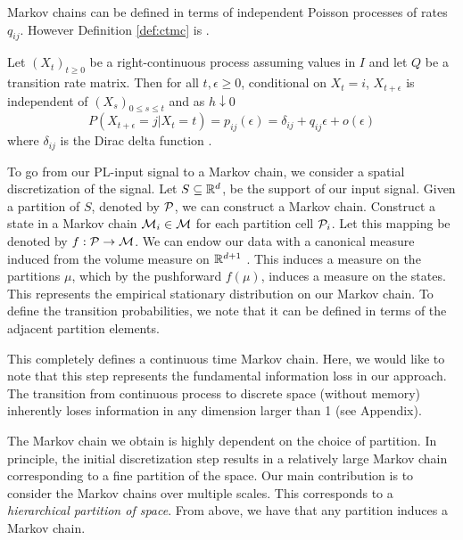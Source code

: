 Markov chains can be defined in terms of  independent Poisson processes
of rates $q_{ij}$. However Definition \ref{def:ctmc} is .

\begin{defn}
	\label{def:ctmc}
	Let $(X_t)_{t \ge 0}$ be a right-continuous process assuming values in $I$ and let $Q$
	be a transition rate matrix. Then for all $t, \epsilon \ge 0$, conditional on $X_t = i$,
	$X_{t+\epsilon}$ is independent of $(X_s)_{0 \le s \le t}$ and as $h \downarrow 0$
	\begin{equation}
		\nonumber
		P(X_{t+\epsilon} = j | X_t = t) = p_{ij}(\epsilon) = \delta_{ij} + q_{ij}\epsilon + o(\epsilon)
	\end{equation}
	where $\delta_{ij}$ is the Dirac delta function \cite{norris1998markov}.
\end{defn}



To go from our PL-input signal to a Markov chain, we consider a spatial discretization of the signal.
Let $S\subseteq \mathbb{R}^d$, be the support of our input signal. Given a partition of $S$, denoted by  $\mathcal{P}$, 
we can construct a Markov chain. Construct a  state in a Markov chain $\mathcal{M}_i \in \mathcal{M}$ for each  partition cell $\mathcal{P}_i$. Let this mapping be denoted by $f:\mathcal{P} \rightarrow \mathcal{M}$. We can endow our data with a canonical measure induced from the volume measure on $\mathbb{R}^{d+1}$ . This induces a measure on the partitions $\mu$, which by the  pushforward $f(\mu)$, induces a measure on the states. This represents the empirical stationary distribution on our Markov chain. To define the transition probabilities, we note that it can be defined in terms of the adjacent partition elements.  

This completely defines a continuous time Markov chain. Here, we would like to note that this step represents the fundamental information loss in our approach. The transition from continuous process to discrete space (without memory) inherently loses information in any dimension larger than 1 (see Appendix).  

The Markov chain we obtain is highly dependent on the choice of partition. In principle, the initial discretization step  results in a relatively large Markov chain corresponding to a fine partition of the space. Our main contribution is to consider the Markov chains over multiple scales. This corresponds to a \emph{hierarchical partition of space}. From above, we have that any partition induces a Markov chain. 

